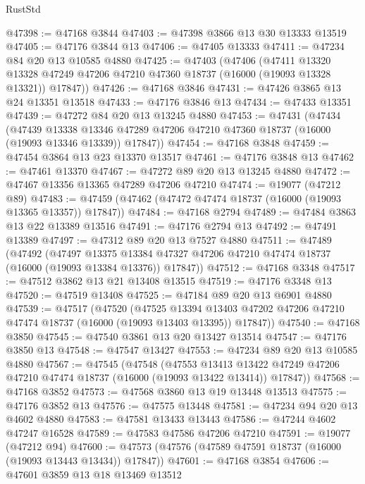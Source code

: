 \begin{lexlean}{RustStd}
\begin{coremodule}
@47398 := @47168 @3844
@47403 := @47398 @3866 @13 @30 @13333 @13519
@47405 := @47176 @3844 @13
@47406 := @47405 @13333
@47411 := @47234 @84 @20 @13 @10585 @4880
@47425 := @47403
    (@47406
      (@47411
        @13320
        @13328
        @47249
        @47206
        @47210
        @47360
        @18737
        (@16000 (@19093 @13328 @13321))
        @17847))
@47426 := @47168 @3846
@47431 := @47426 @3865 @13 @24 @13351 @13518
@47433 := @47176 @3846 @13
@47434 := @47433 @13351
@47439 := @47272 @84 @20 @13 @13245 @4880
@47453 := @47431
    (@47434
      (@47439
        @13338
        @13346
        @47289
        @47206
        @47210
        @47360
        @18737
        (@16000 (@19093 @13346 @13339))
        @17847))
@47454 := @47168 @3848
@47459 := @47454 @3864 @13 @23 @13370 @13517
@47461 := @47176 @3848 @13
@47462 := @47461 @13370
@47467 := @47272 @89 @20 @13 @13245 @4880
@47472 := @47467 @13356 @13365 @47289 @47206 @47210
@47474 := @19077 (@47212 @89)
@47483 := @47459 (@47462 (@47472 @47474 @18737 (@16000 (@19093 @13365 @13357)) @17847))
@47484 := @47168 @2794
@47489 := @47484 @3863 @13 @22 @13389 @13516
@47491 := @47176 @2794 @13
@47492 := @47491 @13389
@47497 := @47312 @89 @20 @13 @7527 @4880
@47511 := @47489
    (@47492
      (@47497
        @13375
        @13384
        @47327
        @47206
        @47210
        @47474
        @18737
        (@16000 (@19093 @13384 @13376))
        @17847))
@47512 := @47168 @3348
@47517 := @47512 @3862 @13 @21 @13408 @13515
@47519 := @47176 @3348 @13
@47520 := @47519 @13408
@47525 := @47184 @89 @20 @13 @6901 @4880
@47539 := @47517
    (@47520
      (@47525
        @13394
        @13403
        @47202
        @47206
        @47210
        @47474
        @18737
        (@16000 (@19093 @13403 @13395))
        @17847))
@47540 := @47168 @3850
@47545 := @47540 @3861 @13 @20 @13427 @13514
@47547 := @47176 @3850 @13
@47548 := @47547 @13427
@47553 := @47234 @89 @20 @13 @10585 @4880
@47567 := @47545
    (@47548
      (@47553
        @13413
        @13422
        @47249
        @47206
        @47210
        @47474
        @18737
        (@16000 (@19093 @13422 @13414))
        @17847))
@47568 := @47168 @3852
@47573 := @47568 @3860 @13 @19 @13448 @13513
@47575 := @47176 @3852 @13
@47576 := @47575 @13448
@47581 := @47234 @94 @20 @13 @4602 @4880
@47583 := @47581 @13433 @13443
@47586 := @47244 @4602 @47247 @16528
@47589 := @47583 @47586 @47206 @47210
@47591 := @19077 (@47212 @94)
@47600 := @47573 (@47576 (@47589 @47591 @18737 (@16000 (@19093 @13443 @13434)) @17847))
@47601 := @47168 @3854
@47606 := @47601 @3859 @13 @18 @13469 @13512

\end{coremodule}
\end{lexlean}
